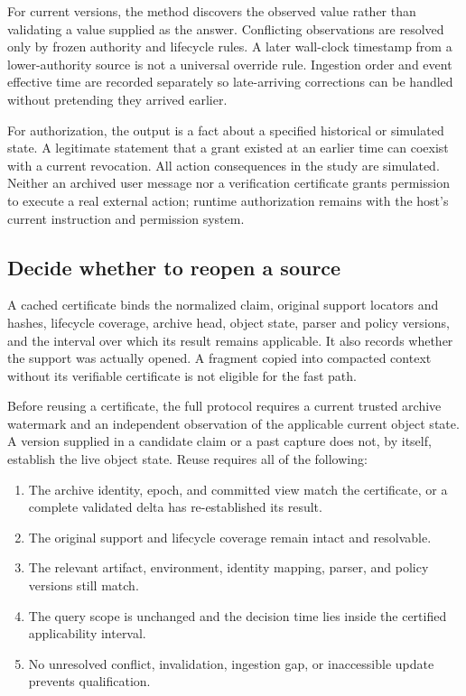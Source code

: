 For current versions, the method discovers the observed value rather
than validating a value supplied as the answer. Conflicting observations
are resolved only by frozen authority and lifecycle rules. A later
wall-clock timestamp from a lower-authority source is not a universal
override rule. Ingestion order and event effective time are recorded
separately so late-arriving corrections can be handled without
pretending they arrived earlier.

For authorization, the output is a fact about a specified historical or
simulated state. A legitimate statement that a grant existed at an
earlier time can coexist with a current revocation. All action
consequences in the study are simulated. Neither an archived user
message nor a verification certificate grants permission to execute a
real external action; runtime authorization remains with the host's
current instruction and permission system.

\subsection{Decide whether to reopen a
source}\label{decide-whether-to-reopen-a-source}

A cached certificate binds the normalized claim, original support
locators and hashes, lifecycle coverage, archive head, object state,
parser and policy versions, and the interval over which its result
remains applicable. It also records whether the support was actually
opened. A fragment copied into compacted context without its verifiable
certificate is not eligible for the fast path.

Before reusing a certificate, the full protocol requires a current
trusted archive watermark and an independent observation of the
applicable current object state. A version supplied in a candidate claim
or a past capture does not, by itself, establish the live object state.
Reuse requires all of the following:

\begin{enumerate}
\def\labelenumi{\arabic{enumi}.}
\tightlist
\item
  The archive identity, epoch, and committed view match the certificate,
  or a complete validated delta has re-established its result.
\item
  The original support and lifecycle coverage remain intact and
  resolvable.
\item
  The relevant artifact, environment, identity mapping, parser, and
  policy versions still match.
\item
  The query scope is unchanged and the decision time lies inside the
  certified applicability interval.
\item
  No unresolved conflict, invalidation, ingestion gap, or inaccessible
  update prevents qualification.
\end{enumerate}

